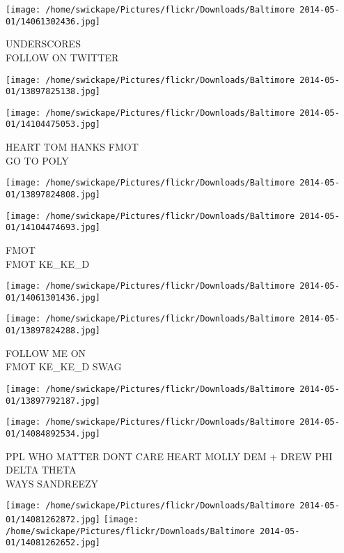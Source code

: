 \documentclass[10pt,letterpaper]{article}
\begin{document}
\vspace{0.25in}
\texttt{[image: /home/swickape/Pictures/flickr/Downloads/Baltimore 2014-05-01/14061302436.jpg]}

UNDERSCORES\\
FOLLOW ON TWITTER
\pagebreak

\texttt{[image: /home/swickape/Pictures/flickr/Downloads/Baltimore 2014-05-01/13897825138.jpg]}

\vspace{0.25in}
\texttt{[image: /home/swickape/Pictures/flickr/Downloads/Baltimore 2014-05-01/14104475053.jpg]}

HEART TOM HANKS FMOT\\
GO TO POLY
\pagebreak

\texttt{[image: /home/swickape/Pictures/flickr/Downloads/Baltimore 2014-05-01/13897824808.jpg]}

\vspace{0.25in}
\texttt{[image: /home/swickape/Pictures/flickr/Downloads/Baltimore 2014-05-01/14104474693.jpg]}

FMOT\\
FMOT KE\_KE\_D
\pagebreak

\texttt{[image: /home/swickape/Pictures/flickr/Downloads/Baltimore 2014-05-01/14061301436.jpg]}

\vspace{0.25in}
\texttt{[image: /home/swickape/Pictures/flickr/Downloads/Baltimore 2014-05-01/13897824288.jpg]}

FOLLOW ME ON\\
FMOT KE\_KE\_D SWAG
\pagebreak

\texttt{[image: /home/swickape/Pictures/flickr/Downloads/Baltimore 2014-05-01/13897792187.jpg]}

\vspace{0.25in}
\texttt{[image: /home/swickape/Pictures/flickr/Downloads/Baltimore 2014-05-01/14084892534.jpg]}

PPL WHO MATTER DONT CARE HEART MOLLY DEM + DREW PHI DELTA THETA\\
WAYS SANDREEZY
\pagebreak

\texttt{[image: /home/swickape/Pictures/flickr/Downloads/Baltimore 2014-05-01/14081262872.jpg]}
\texttt{[image: /home/swickape/Pictures/flickr/Downloads/Baltimore 2014-05-01/14081262652.jpg]}
\end{document}
